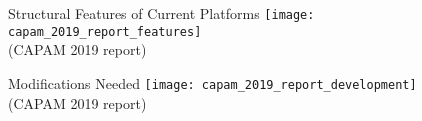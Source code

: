 \documentclass[aspectratio=169,fleqn]{beamer}
\begin{document}
\begin{frame}{Structural Features of Current Platforms}\fns
  \texttt{[image: capam\_2019\_report\_features]}\\[2ex]
  \gray\scriptsize (CAPAM 2019 report)
\end{frame}


\begin{frame}{Modifications Needed}\fns
  \vspace{4ex}
  \texttt{[image: capam\_2019\_report\_development]}\\[5ex]
  \gray\scriptsize (CAPAM 2019 report)
\end{frame}

\end{document}
